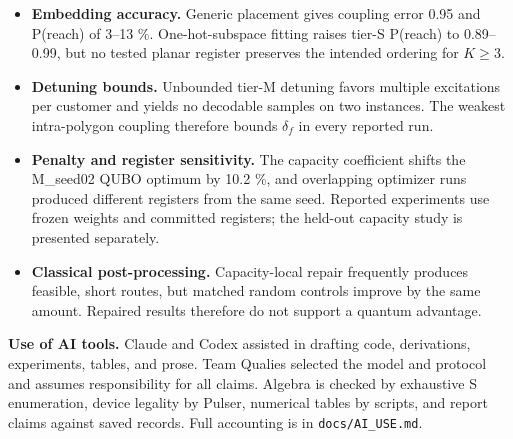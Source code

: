 \documentclass[9pt,a4paper]{extarticle}
\providecommand{\tightlist}{\setlength{\itemsep}{0pt}\setlength{\parskip}{0pt}}
\begin{document}
\begin{itemize}
\tightlist
\item
  \textbf{Embedding accuracy.} Generic placement gives coupling error
  0.95 and P(reach) of 3--13 \%. One-hot-subspace fitting raises tier-S
  P(reach) to 0.89--0.99, but no tested planar register preserves the
  intended ordering for \(K\ge3\).
\item
  \textbf{Detuning bounds.} Unbounded tier-M detuning favors multiple
  excitations per customer and yields no decodable samples on two
  instances. The weakest intra-polygon coupling therefore bounds
  \(\delta_f\) in every reported run.
\item
  \textbf{Penalty and register sensitivity.} The capacity coefficient
  shifts the M\_seed02 QUBO optimum by 10.2 \%, and overlapping
  optimizer runs produced different registers from the same seed.
  Reported experiments use frozen weights and committed registers; the
  held-out capacity study is presented separately.
\item
  \textbf{Classical post-processing.} Capacity-local repair frequently
  produces feasible, short routes, but matched random controls improve
  by the same amount. Repaired results therefore do not support a
  quantum advantage.
\end{itemize}

\textbf{Use of AI tools.} Claude and Codex assisted in drafting code,
derivations, experiments, tables, and prose. Team Qualies selected the
model and protocol and assumes responsibility for all claims. Algebra is
checked by exhaustive S enumeration, device legality by Pulser,
numerical tables by scripts, and report claims against saved records.
Full accounting is in \texttt{docs/AI\_USE.md}.
\end{document}
